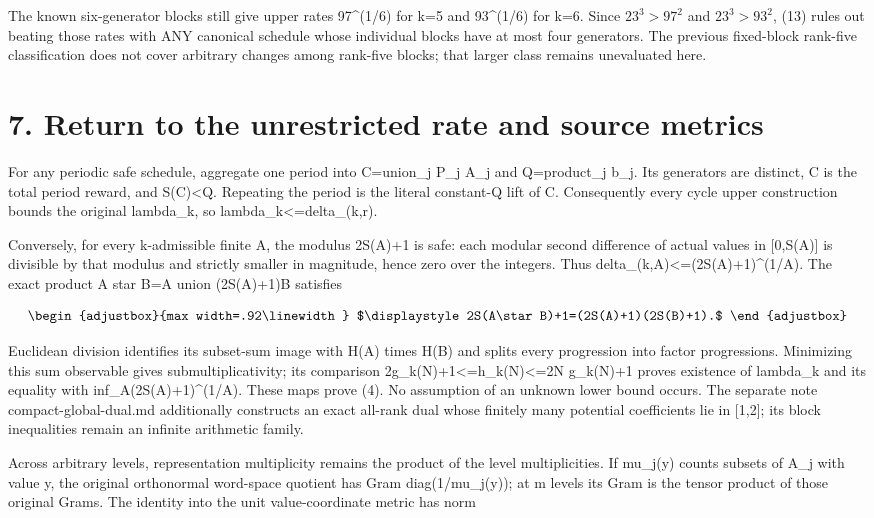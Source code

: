 The known six-generator blocks still give upper rates 97\^{}(1/6) for k=5 and 93\^{}(1/6) for k=6. Since \(23^3>97^2\) and \(23^3>93^2\), (13) rules out beating those rates with ANY canonical schedule whose individual blocks have at most four generators. The previous fixed-block rank-five classification does not cover arbitrary changes among rank-five blocks; that larger class remains unevaluated here.

\section{7. Return to the unrestricted rate and source metrics}\label{n07-return-to-the-unrestricted-rate-and-source-metrics}

For any periodic safe schedule, aggregate one period into C=union\_j P\_j A\_j and Q=product\_j b\_j. Its generators are distinct, \textbar C\textbar{} is the total period reward, and S(C)\textless Q. Repeating the period is the literal constant-Q lift of C. Consequently every cycle upper construction bounds the original lambda\_k, so lambda\_k\textless=delta\_(k,r).

Conversely, for every k-admissible finite A, the modulus 2S(A)+1 is safe: each modular second difference of actual values in {[}0,S(A){]} is divisible by that modulus and strictly smaller in magnitude, hence zero over the integers. Thus delta\_(k,\textbar A\textbar)\textless=(2S(A)+1)\^{}(1/\textbar A\textbar). The exact product A star B=A union (2S(A)+1)B satisfies

\[
\begin{adjustbox}{max width=.92\linewidth}
$\displaystyle 2S(A\star B)+1=(2S(A)+1)(2S(B)+1).$
\end{adjustbox}
\]

Euclidean division identifies its subset-sum image with H(A) times H(B) and splits every progression into factor progressions. Minimizing this sum observable gives submultiplicativity; its comparison 2g\_k(N)+1\textless=h\_k(N)\textless=2N g\_k(N)+1 proves existence of lambda\_k and its equality with inf\_A(2S(A)+1)\^{}(1/\textbar A\textbar). These maps prove (4). No assumption of an unknown lower bound occurs. The separate note compact-global-dual.md additionally constructs an exact all-rank dual whose finitely many potential coefficients lie in {[}1,2{]}; its block inequalities remain an infinite arithmetic family.

Across arbitrary levels, representation multiplicity remains the product of the level multiplicities. If mu\_j(y) counts subsets of A\_j with value y, the original orthonormal word-space quotient has Gram diag(1/mu\_j(y)); at m levels its Gram is the tensor product of those original Grams. The identity into the unit value-coordinate metric has norm

